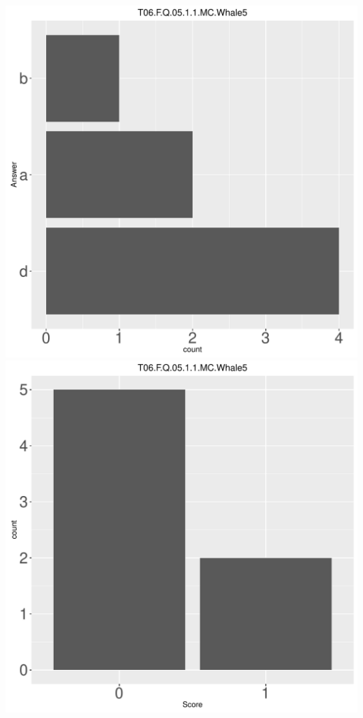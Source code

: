 \documentclass[12pt,english,nohyper]{tufte-handout}\usepackage[]{graphicx}\usepackage[]{color}
\begin{document}
\begin{center} \includegraphics[width=.45\linewidth]{Topic06_AB_68_answer} \includegraphics[width=.45\linewidth]{Topic06_AB_68_score} \end{center} 
\end{document}
